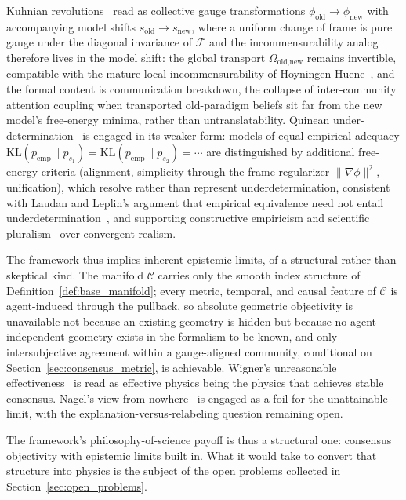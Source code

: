 \documentclass[11pt]{article}
\begin{document}
Kuhnian revolutions~\cite{Kuhn1962} read as collective gauge transformations $\phi_{\text{old}} \to \phi_{\text{new}}$ with accompanying model shifts $s_{\text{old}} \to s_{\text{new}}$, where a uniform change of frame is pure gauge under the diagonal invariance of $\mathcal{F}$ and the incommensurability analog therefore lives in the model shift: the global transport $\Omega_{\text{old,new}}$ remains invertible, compatible with the mature local incommensurability of Hoyningen-Huene~\cite{Hoyningen-Huene1993}, and the formal content is communication breakdown, the collapse of inter-community attention coupling when transported old-paradigm beliefs sit far from the new model's free-energy minima, rather than untranslatability. Quinean under-determination~\cite{Quine1951, Quine1975} is engaged in its weaker form: models of equal empirical adequacy $\mathrm{KL}(p_{\mathrm{emp}} \| p_{s_1}) = \mathrm{KL}(p_{\mathrm{emp}} \| p_{s_2}) = \cdots$ are distinguished by additional free-energy criteria (alignment, simplicity through the frame regularizer $\|\nabla\phi\|^2$, unification), which resolve rather than represent underdetermination, consistent with Laudan and Leplin's argument that empirical equivalence need not entail underdetermination~\cite{LaudanLeplin1991}, and supporting constructive empiricism and scientific pluralism~\cite{Longino2002} over convergent realism.

The framework thus implies inherent epistemic limits, of a structural rather than skeptical kind. The manifold $\mathcal{C}$ carries only the smooth index structure of Definition~\ref{def:base_manifold}; every metric, temporal, and causal feature of $\mathcal{C}$ is agent-induced through the pullback, so absolute geometric objectivity is unavailable not because an existing geometry is hidden but because no agent-independent geometry exists in the formalism to be known, and only intersubjective agreement within a gauge-aligned community, conditional on Section~\ref{sec:consensus_metric}, is achievable. Wigner's unreasonable effectiveness~\cite{Wigner1960} is read as effective physics being the physics that achieves stable consensus. Nagel's view from nowhere~\cite{Nagel1986} is engaged as a foil for the unattainable limit, with the explanation-versus-relabeling question remaining open.

The framework's philosophy-of-science payoff is thus a structural one: consensus objectivity with epistemic limits built in. What it would take to convert that structure into physics is the subject of the open problems collected in Section~\ref{sec:open_problems}.
\end{document}
